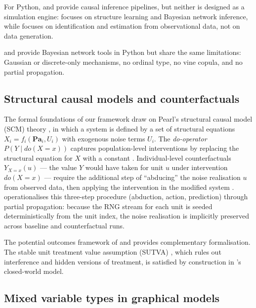 \documentclass[article]{jss}
\begin{document}
For Python,  \citep{beaumont2021causalnex} and  \citep{sharma2020dowhy} provide causal inference pipelines, but neither is designed as a simulation engine:  focuses on structure learning and Bayesian network inference, while  focuses on identification and estimation from observational data, not on data generation.

 \citep{martinezrodriguez2023} and  \citep{ankan2015pgmpy} provide Bayesian network tools in Python but share the same limitations: Gaussian or discrete-only mechanisms, no ordinal type, no vine copula, and no partial propagation.

\subsection{Structural causal models and counterfactuals}

The formal foundations of our framework draw on Pearl's structural causal model (SCM) theory \citep{pearl2009causality}, in which a system is defined by a set of structural equations $X_i = f_i(\mathbf{Pa}_i, U_i)$ with exogenous noise terms $U_i$. The \emph{do-operator} $P(Y \mid do(X=x))$ captures population-level interventions by replacing the structural equation for $X$ with a constant \citep{pearl1995causal}. Individual-level counterfactuals $Y_{X=x}(u)$ --- the value $Y$ would have taken for unit $u$ under intervention $do(X=x)$ --- require the additional step of ``abducing'' the noise realisation $u$ from observed data, then applying the intervention in the modified system \citep{pearl2009causality}.  operationalises this three-step procedure (abduction, action, prediction) through partial propagation: because the RNG stream for each unit is seeded deterministically from the unit index, the noise realisation is implicitly preserved across baseline and counterfactual runs.

The potential outcomes framework of \citet{rubin1974estimating} and \citet{neyman1923} provides complementary formalisation. The stable unit treatment value assumption (SUTVA) \citep{rubin1980randomization}, which rules out interference and hidden versions of treatment, is satisfied by construction in 's closed-world model.

\subsection{Mixed variable types in graphical models}
\end{document}
